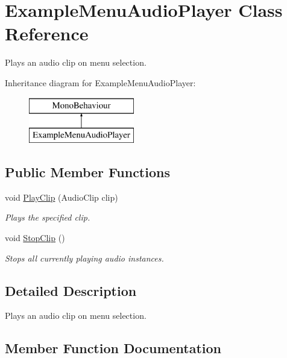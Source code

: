 \hypertarget{class_example_menu_audio_player}{}\section{Example\+Menu\+Audio\+Player Class Reference}
\label{class_example_menu_audio_player}


Plays an audio clip on menu selection.  


Inheritance diagram for Example\+Menu\+Audio\+Player\+:\begin{figure}[H]
\begin{center}
\leavevmode
\includegraphics[height=2.000000cm]{class_example_menu_audio_player}
\end{center}
\end{figure}
\subsection*{Public Member Functions}
\begin{DoxyCompactItemize}
\item 
void \hyperlink{class_example_menu_audio_player_a477b078645559fc6ad085d04135015a3}{Play\+Clip} (Audio\+Clip clip)
\begin{DoxyCompactList}\small\item\em Plays the specified clip. \end{DoxyCompactList}\item 
void \hyperlink{class_example_menu_audio_player_a19855c2aaa1356f311ddad50838029c0}{Stop\+Clip} ()
\begin{DoxyCompactList}\small\item\em Stops all currently playing audio instances. \end{DoxyCompactList}\end{DoxyCompactItemize}


\subsection{Detailed Description}
Plays an audio clip on menu selection. 



\subsection{Member Function Documentation}
\hypertarget{class_example_menu_audio_player_a477b078645559fc6ad085d04135015a3}{}
